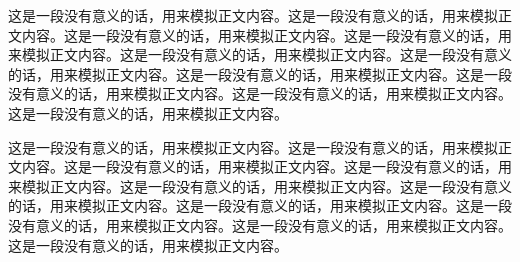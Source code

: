 
这是一段没有意义的话，用来模拟正文内容。这是一段没有意义的话，用来模拟正文内容。这是一段没有意义的话，用来模拟正文内容。这是一段没有意义的话，用来模拟正文内容。这是一段没有意义的话，用来模拟正文内容。这是一段没有意义的话，用来模拟正文内容。这是一段没有意义的话，用来模拟正文内容。这是一段没有意义的话，用来模拟正文内容。这是一段没有意义的话，用来模拟正文内容。这是一段没有意义的话，用来模拟正文内容。


这是一段没有意义的话，用来模拟正文内容。这是一段没有意义的话，用来模拟正文内容。这是一段没有意义的话，用来模拟正文内容。这是一段没有意义的话，用来模拟正文内容。这是一段没有意义的话，用来模拟正文内容。这是一段没有意义的话，用来模拟正文内容。这是一段没有意义的话，用来模拟正文内容。这是一段没有意义的话，用来模拟正文内容。这是一段没有意义的话，用来模拟正文内容。这是一段没有意义的话，用来模拟正文内容。
